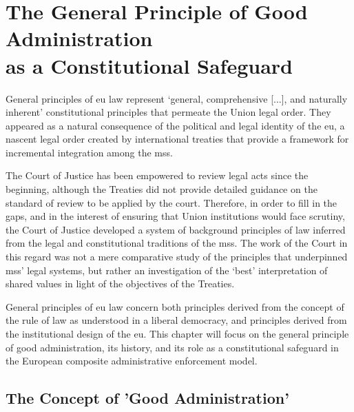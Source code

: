 \section[The General Principle of Good Administration as a Constitutional Safeguard]{The General Principle of Good Administration\\as a Constitutional Safeguard}
\label{sec:ch2-good-administration}

General principles of \gls{eu} law represent `general, comprehensive [...], and naturally inherent'\autocite[42]{audiolux} constitutional principles that permeate the Union legal order.\autocite[7]{tridimasGeneralPrinciplesEU2020} 
They appeared as a natural consequence of the political and legal identity of the \gls{eu},\autocite[2]{TEU} a nascent legal order created by international treaties that provide a framework for incremental integration among the \glspl{ms}.\autocite[17--18]{tridimasGeneralPrinciplesBook2006}

The Court of Justice has been empowered to review legal acts since the beginning,\autocite[173]{treatyofRome} although the Treaties did not provide detailed guidance on the standard of review to be applied by the court.\autocite[265--266]{craigFoundations2018} 
Therefore, in order to fill in the gaps, and in the interest of ensuring that Union institutions would face scrutiny,\autocite[269]{craigFoundations2018} the Court of Justice developed a system of background principles of law inferred from the legal and constitutional traditions of the \glspl{ms}.\autocite[269--270]{craigFoundations2018}
The work of the Court in this regard was not a mere comparative study of the principles that underpinned \glspl{ms}' legal systems, but rather an investigation of the `best' interpretation of shared values in light of the objectives of the Treaties.\autocites[270]{craigFoundations2018}[See also][point 69]{audioluxAG}

General principles of \gls{eu} law concern both principles derived from the concept of the rule of law as understood in a liberal democracy,\autocites[9]{tridimasGeneralPrinciplesEU2020}[point 69]{audioluxAG} and principles derived from the institutional design of the \gls{eu}.\autocite[11--12]{tridimasGeneralPrinciplesEU2020}
This chapter will focus on the general principle of good administration, its history, and its role as a constitutional safeguard in the European composite administrative enforcement model.

\newpage
\subsection{The Concept of 'Good Administration'}
\label{sec:ch2-good-administration-concept}

